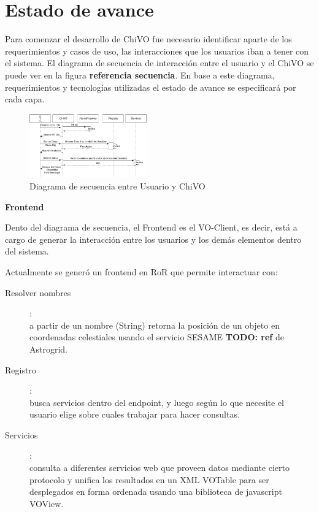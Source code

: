 \section{Estado de avance}

Para comenzar el desarrollo de ChiVO fue necesario identificar aparte de los 
requerimientos y casos de uso, las interacciones que los usuarios iban a tener 
con el sistema. El diagrama de secuencia de interacción entre el usuario y el 
ChiVO se puede ver en la figura \textbf{referencia secuencia}. 
En base a este diagrama, requerimientos y tecnologías utilizadas el estado de 
avance se especificará por cada capa.

\begin{figure}[h]
    \centering
    \includegraphics[width=0.45\textwidth]{images/secuencia.png}
    \caption{Diagrama de secuencia entre Usuario y ChiVO}
    \label{fig:secuencia}
\end{figure}

\textbf{Frontend}

Dento del diagrama de secuencia, el Frontend es el VO-Client, es decir, está a cargo de generar la interacción entre los usuarios y los demás elementos dentro del sistema.

Actualmente se generó un frontend en RoR que permite interactuar con: 
\begin{description}
 \item[Resolver nombres]:\hfill \\
  a partir de un nombre (String) retorna la posición de un objeto en coordenadas celestiales usando el servicio SESAME \textbf{TODO: ref} de Astrogrid.
 \item[Registro]: \hfill \\
 busca servicios dentro del endpoint, y luego según lo que necesite el usuario elige sobre cuales trabajar para hacer consultas. 
 \item[Servicios]: \hfill \\
 consulta a diferentes servicios web que proveen datos mediante cierto protocolo y unifica los resultados en un XML VOTable para ser desplegados en forma ordenada usando una biblioteca de javascript VOView.
\end{description}

